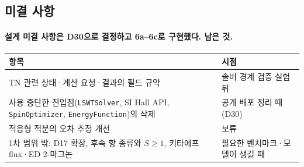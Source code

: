 \subsection{미결 사항}\label{open-questions}
\begingroup%
  \framesubtitle{설계 미결 사항은 D30으로 결정하고 6a--6c로 구현했다. 남은 것.}
  \footnotesize\renewcommand{\arraystretch}{1.05}
  \begin{tabularx}{\textwidth}{@{}Yp{3.4cm}@{}}
    \toprule
    항목 & 시점 \\
    \midrule
    TN 관련 상태·계산 요청·결과의 필드 규약 & 솔버 경계 검증 실험 뒤 \\
    사용 중단한 진입점(\texttt{LSWTSolver}, SI Hall API, \texttt{SpinOptimizer}, \texttt{EnergyFunction})의 삭제 & 공개 배포 정리 때(D30) \\
    적응형 적분의 오차 추정 개선 & 보류 \\
    1차 범위 밖: D17 확장, 후속 항 종류와 $S\ge1$, 키타에프 flux·ED 2-마그논 & 필요한 벤치마크·모델이 생길 때 \\
    \bottomrule
  \end{tabularx}
  \par\medskip
\endgroup


